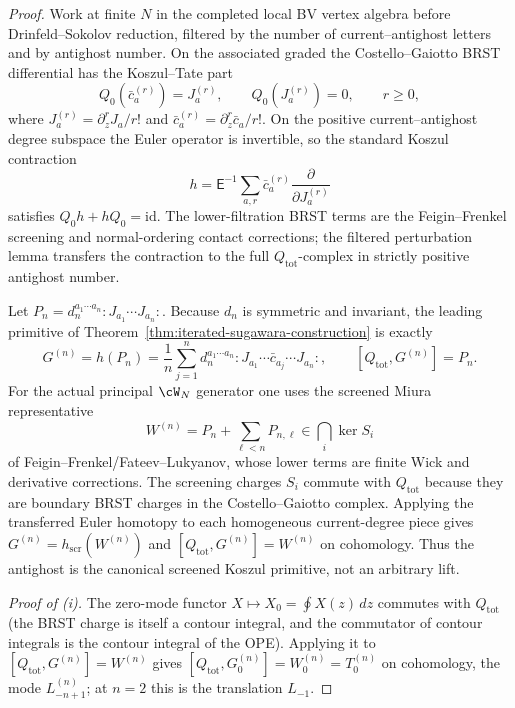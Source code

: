 \begin{proof}
Work at finite $N$ in the completed local BV vertex algebra before
Drinfeld--Sokolov reduction, filtered by the number of current--antighost
letters and by antighost number. On the associated graded the
Costello--Gaiotto BRST differential has the Koszul--Tate part
\begin{equation}\label{eq:KT-current-antighost}
Q_0(\bar c_a^{(r)})=J_a^{(r)},\qquad
Q_0(J_a^{(r)})=0,\qquad r\ge 0,
\end{equation}
where $J_a^{(r)}=\partial_z^rJ_a/r!$ and
$\bar c_a^{(r)}=\partial_z^r\bar c_a/r!$. On the positive
current--antighost degree subspace the Euler operator is invertible, so
the standard Koszul contraction
\begin{equation}\label{eq:KT-homotopy}
h
=
\mathsf E^{-1}\sum_{a,r}\bar c_a^{(r)}
\frac{\partial}{\partial J_a^{(r)}}
\end{equation}
satisfies $Q_0h+hQ_0=\mathrm{id}$. The lower-filtration BRST terms are
the Feigin--Frenkel screening and normal-ordering contact corrections;
the filtered perturbation lemma transfers the contraction to the full
$Q_{\mathrm{tot}}$-complex in strictly positive antighost number.

Let $P_n=d_n^{a_1\cdots a_n}{:}J_{a_1}\cdots J_{a_n}{:}$. Because
$d_n$ is symmetric and invariant, the leading primitive of
Theorem~\ref{thm:iterated-sugawara-construction} is exactly
\begin{equation}\label{eq:G-as-hP}
G^{(n)}=h(P_n)=
\frac1n\sum_{j=1}^n d_n^{a_1\cdots a_n}
{:}J_{a_1}\cdots\bar c_{a_j}\cdots J_{a_n}{:},
\qquad
[Q_{\mathrm{tot}},G^{(n)}]=P_n .
\end{equation}
For the actual principal $\cW_N$ generator one uses the screened Miura
representative
\[
W^{(n)}=P_n+\sum_{\ell<n}P_{n,\ell}
\in\bigcap_i\ker S_i
\]
of Feigin--Frenkel/Fateev--Lukyanov, whose lower terms are finite Wick
and derivative corrections. The screening charges $S_i$ commute with
$Q_{\mathrm{tot}}$ because they are boundary BRST charges in the
Costello--Gaiotto complex. Applying the transferred Euler homotopy to
each homogeneous current-degree piece gives
$G^{(n)}=h_{\mathrm{scr}}(W^{(n)})$ and
$[Q_{\mathrm{tot}},G^{(n)}]=W^{(n)}$ on cohomology. Thus the antighost
is the canonical screened Koszul primitive, not an arbitrary lift.

\emph{Proof of \textup{(i)}.} The zero-mode functor
$X\mapsto X_0=\oint X(z)\,dz$ commutes with $Q_{\mathrm{tot}}$
(the BRST charge is itself a contour integral, and the commutator of
contour integrals is the contour integral of the OPE). Applying it to
$[Q_{\mathrm{tot}},G^{(n)}]=W^{(n)}$ gives
$[Q_{\mathrm{tot}},G^{(n)}_0]=W^{(n)}_0=T^{(n)}_0$ on cohomology,
the mode $L^{(n)}_{-n+1}$; at $n=2$ this is the translation $L_{-1}$.


\end{proof}
